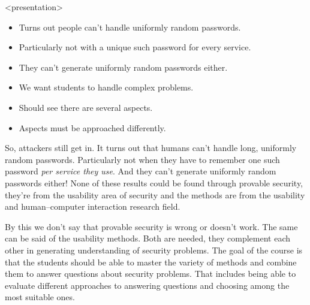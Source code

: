 \begin{frame}<presentation>
  \begin{example}[Usability]
    \begin{itemize}
      \item Turns out people can't handle uniformly random passwords.
      \item Particularly not with a unique such password for every service.
      \item They can't generate uniformly random passwords either.
    \end{itemize}
  \end{example}

  \pause

  \begin{remark}
    \begin{itemize}
      \item We want students to handle complex problems.
      \item Should see there are several aspects.
      \item Aspects must be approached differently.
    \end{itemize}
  \end{remark}
\end{frame}

So, attackers still get in.
It turns out that humans can't handle long, uniformly random passwords.
Particularly not when they have to remember one such password \emph{per service 
they use}.
And they can't generate uniformly random passwords either!
None of these results could be found through provable security, they're from 
the usability area of security and the methods are from the usability and 
human--computer interaction research field.

By this we don't say that provable security is wrong or doesn't work.
The same can be said of the usability methods.
Both are needed, they complement each other in generating understanding of 
security problems.
The goal of the course is that the students should be able to master the 
variety of methods and combine them to answer questions about security 
problems.
That includes being able to evaluate different approaches to answering 
questions and choosing among the most suitable ones.


